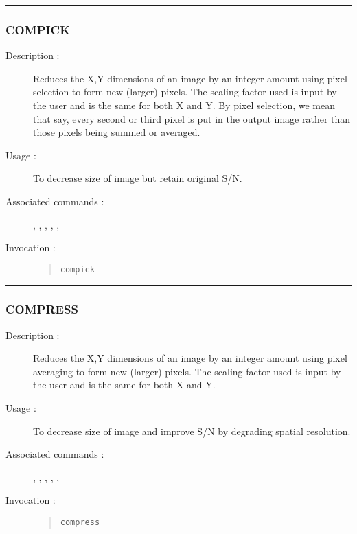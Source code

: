 \hrule
\subsubsection*{\label{COMPICK}COMPICK}

\begin{description}

\item[Description :] Reduces the X,Y dimensions of an image by an
integer amount using pixel selection to form new (larger) pixels.  The
scaling factor used is input by the user and is the same for both X and
Y.  By pixel selection, we mean that say, every second or third pixel
is put in the output image rather than those pixels being summed or
averaged.

\item[Usage :] To decrease size of image but retain original S/N.

\item[Associated commands :] {\tt {}},
{\tt {}}, {\tt {}},
{\tt {}}, {\tt {}},
{\tt {}}

\item[Invocation :]

\begin{quote}{\tt  compick }\end{quote}

\end{description}

\hrule
\subsubsection*{\label{COMPRESS}COMPRESS}

\begin{description}

\item[Description :] Reduces the X,Y dimensions of an image by an
integer amount using pixel averaging to form new (larger) pixels.  The
scaling factor used is input by the user and is the same for both X and
Y.

\item[Usage :] To decrease size of image and improve S/N by degrading
spatial resolution.

\item[Associated commands :] {\tt {}},
{\tt {}}, {\tt {}},
{\tt {}}, {\tt {}},
{\tt {}}

\item[Invocation :]

\begin{quote}{\tt  compress }\end{quote}

\end{description}

